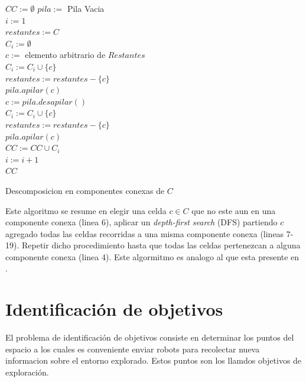 \begin{algorithm}[H]
\SetAlgoLined
  $CC := \emptyset$
  $pila :=$ Pila Vacia \\
  $i := 1$ \\
  $restantes := C$ \\
   {
    $C_i := \emptyset $ \\
    $c :=$ elemento arbitrario de $Restantes$ \\


    $C_i :=  C_i \cup \{c\}$ \\
    $restantes := restantes - \{c\}$ \\
    $pila.apilar(c)$ \\
     {
      $c := pila.desapilar()$ \\
       {
         {
          $C_i :=  C_i \cup \{c\}$ \\
          $restantes := restantes - \{c\}$ \\
          $pila.apilar(c)$ \\
        }
      }
    }
    $CC := CC \cup C_i$ \\
    $i := i + 1$ \\
  }
  \Return $CC$ 

  \caption{Descomposicion en componentes conexas de $C$}
  \label{alg:compcon}
\end{algorithm}

Este algoritmo se resume en elegir una celda $c\in C$ que no este aun en una
componente conexa (linea 6), aplicar un \emph{depth-first search} (DFS)
partiendo $c$ agregado todas las celdas recorridas a una misma componente
conexa (lineas 7-19). Repetir dicho procedimiento hasta que todas las celdas
pertenezcan a alguna componente conexa (linea 4). Este algormitmo es analogo al
que esta presente en \cite{hopcroft1973algorithm}.

\section{Identificación de objetivos}
El problema de identificación de objetivos consiste en determinar los puntos
del espacio a los cuales es conveniente enviar robots para recolectar nueva
informacion sobre el entorno explorado. Estos puntos son los llamdos objetivos
de exploración. 

